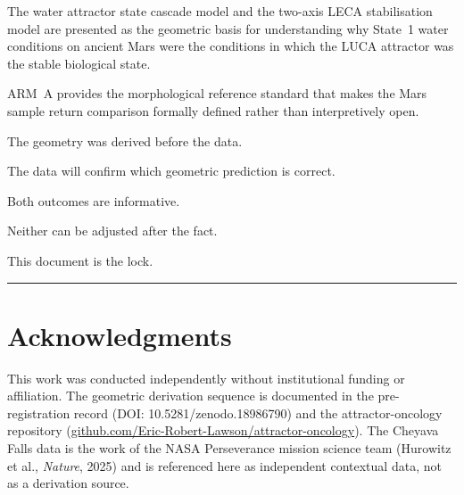 \documentclass[11pt, a4paper]{article}
\begin{document}
The water attractor state cascade model and the
two-axis LECA stabilisation model are presented
as the geometric basis for understanding why
State~1 water conditions on ancient Mars were
the conditions in which the LUCA attractor was
the stable biological state.

ARM~A provides the morphological reference
standard that makes the Mars sample return
comparison formally defined rather than
interpretively open.

The geometry was derived before the data.

The data will confirm which geometric prediction
is correct.

Both outcomes are informative.

Neither can be adjusted after the fact.

This document is the lock.

\vspace{1em}
\noindent\textcolor{rulecolor}{\rule{\linewidth}{0.4pt}}

\section*{Acknowledgments}

This work was conducted independently without
institutional funding or affiliation.
The geometric derivation sequence is documented
in the pre-registration record
(DOI: 10.5281/zenodo.18986790) and the
attractor-oncology repository
(\href{https://github.com/Eric-Robert-Lawson/attractor-oncology}{github.com/Eric-Robert-Lawson/attractor-oncology}).
The Cheyava Falls data is the work of the NASA
Perseverance mission science team
(Hurowitz et al., \textit{Nature}, 2025)
and is referenced here as independent
contextual data, not as a derivation source.
\end{document}
